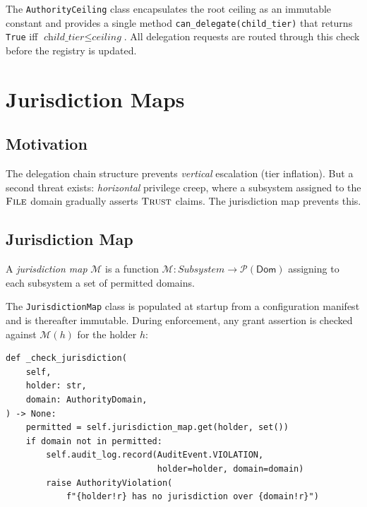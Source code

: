 \documentclass[11pt]{article}
\newcommand{\ADom}{\mathsf{Dom}}            %
\newcommand{\JMap}{\mathcal{M}}             %
\newcommand{\DomTRUST}{\textsc{Trust}}
\newcommand{\DomFILE}{\textsc{File}}
\begin{document}
The \texttt{AuthorityCeiling} class encapsulates the root ceiling
as an immutable constant and provides a single method
\texttt{can\_delegate(child\_tier)} that returns \texttt{True} iff
$\textit{child\_tier} \leq \textit{ceiling}$.
All delegation requests are routed through this check before the
registry is updated.

\section{Jurisdiction Maps}\label{sec:jurisdiction}

\subsection{Motivation}

The delegation chain structure prevents \emph{vertical} escalation
(tier inflation).  But a second threat exists: \emph{horizontal}
privilege creep, where a subsystem assigned to the $\DomFILE$ domain
gradually asserts $\DomTRUST$ claims.  The jurisdiction map
prevents this.

\subsection{Jurisdiction Map}

\begin{definition}\label{def:jurismap}
A \emph{jurisdiction map} $\JMap$ is a function
$\JMap : \textit{Subsystem} \to \mathcal{P}(\ADom)$
assigning to each subsystem a set of permitted domains.
\end{definition}

The \texttt{JurisdictionMap} class is populated at startup from a
configuration manifest and is thereafter immutable.  During
enforcement, any grant assertion is checked against
$\JMap(h)$ for the holder $h$:

\begin{lstlisting}[style=jugeo-python, caption={Jurisdiction check in AuthorityEnforcer}]
def _check_jurisdiction(
    self,
    holder: str,
    domain: AuthorityDomain,
) -> None:
    permitted = self.jurisdiction_map.get(holder, set())
    if domain not in permitted:
        self.audit_log.record(AuditEvent.VIOLATION,
                              holder=holder, domain=domain)
        raise AuthorityViolation(
            f"{holder!r} has no jurisdiction over {domain!r}")
\end{lstlisting}
\end{document}
